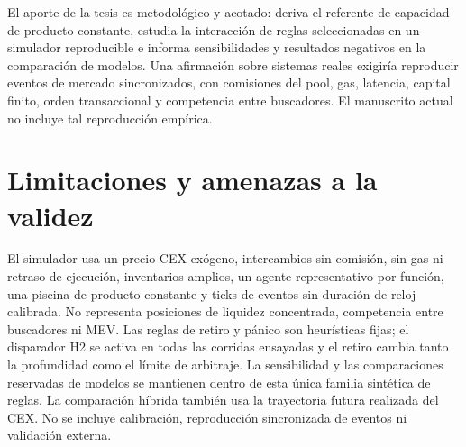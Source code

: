 El aporte de la tesis es metodológico y acotado: deriva el referente de capacidad de producto constante, estudia la interacción de reglas seleccionadas en un simulador reproducible e informa sensibilidades y resultados negativos en la comparación de modelos. Una afirmación sobre sistemas reales exigiría reproducir eventos de mercado sincronizados, con comisiones del pool, gas, latencia, capital finito, orden transaccional y competencia entre buscadores. El manuscrito actual no incluye tal reproducción empírica.

\section{Limitaciones y amenazas a la validez}

El simulador usa un precio CEX exógeno, intercambios sin comisión, sin gas ni retraso de ejecución, inventarios amplios, un agente representativo por función, una piscina de producto constante y ticks de eventos sin duración de reloj calibrada. No representa posiciones de liquidez concentrada, competencia entre buscadores ni MEV. Las reglas de retiro y pánico son heurísticas fijas; el disparador H2 se activa en todas las corridas ensayadas y el retiro cambia tanto la profundidad como el límite de arbitraje. La sensibilidad y las comparaciones reservadas de modelos se mantienen dentro de esta única familia sintética de reglas. La comparación híbrida también usa la trayectoria futura realizada del CEX. No se incluye calibración, reproducción sincronizada de eventos ni validación externa.
